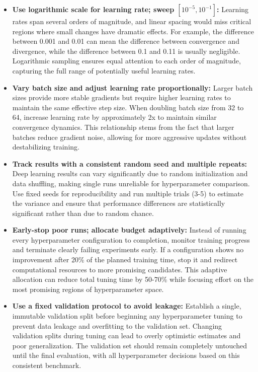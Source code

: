 \begin{itemize}
    \item \textbf{Use logarithmic scale for learning rate; sweep $[10^{-5},10^{-1}]$:} Learning rates span several orders of magnitude, and linear spacing would miss critical regions where small changes have dramatic effects. For example, the difference between 0.001 and 0.01 can mean the difference between convergence and divergence, while the difference between 0.1 and 0.11 is usually negligible. Logarithmic sampling ensures equal attention to each order of magnitude, capturing the full range of potentially useful learning rates.
    
    \item \textbf{Vary batch size and adjust learning rate proportionally:} Larger batch sizes provide more stable gradients but require higher learning rates to maintain the same effective step size. When doubling batch size from 32 to 64, increase learning rate by approximately 2x to maintain similar convergence dynamics. This relationship stems from the fact that larger batches reduce gradient noise, allowing for more aggressive updates without destabilizing training.
    
    \item \textbf{Track results with a consistent random seed and multiple repeats:} Deep learning results can vary significantly due to random initialization and data shuffling, making single runs unreliable for hyperparameter comparison. Use fixed seeds for reproducibility and run multiple trials (3-5) to estimate the variance and ensure that performance differences are statistically significant rather than due to random chance.
    
    \item \textbf{Early-stop poor runs; allocate budget adaptively:} Instead of running every hyperparameter configuration to completion, monitor training progress and terminate clearly failing experiments early. If a configuration shows no improvement after 20\% of the planned training time, stop it and redirect computational resources to more promising candidates. This adaptive allocation can reduce total tuning time by 50-70\% while focusing effort on the most promising regions of hyperparameter space.
    
    \item \textbf{Use a fixed validation protocol to avoid leakage:} Establish a single, immutable validation split before beginning any hyperparameter tuning to prevent data leakage and overfitting to the validation set. Changing validation splits during tuning can lead to overly optimistic estimates and poor generalization. The validation set should remain completely untouched until the final evaluation, with all hyperparameter decisions based on this consistent benchmark.
    

\end{itemize}
